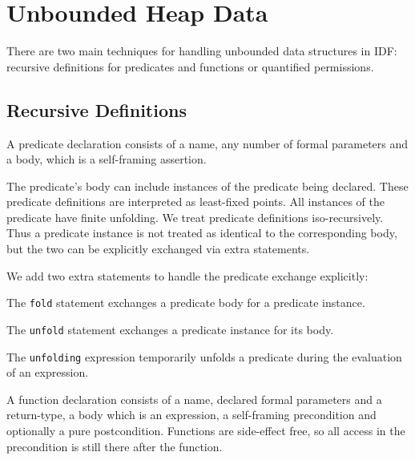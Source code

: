 \section{Unbounded Heap Data}
\begin{mytitle} There are two main techniques for handling unbounded data structures in IDF: recursive definitions for predicates and functions or quantified permissions.
\end{mytitle}

\subsection{Recursive Definitions}
\begin{mytitle}[Predicate] A predicate declaration consists of a name, any number of formal parameters and a body, which is a self-framing assertion. 
\end{mytitle}
\begin{mytitle} The predicate's body can include instances of the predicate being declared. These predicate definitions are interpreted as least-fixed points. All instances of the predicate have finite unfolding. We treat predicate definitions iso-recursively. Thus a predicate instance is not treated as identical to the corresponding body, but the two can be explicitly exchanged via extra statements.
\end{mytitle}
\begin{mytitle} We add two extra statements to handle the predicate exchange explicitly:
    \begin{mysubtitle} The \texttt{fold} statement exchanges a predicate body for a predicate instance.
    \end{mysubtitle}
    \begin{mysubtitle} The \texttt{unfold} statement exchanges a predicate instance for its body.
    \end{mysubtitle}
    \begin{mysubtitle} The \texttt{unfolding} expression temporarily unfolds a predicate during the evaluation of an expression.
    \end{mysubtitle}
\end{mytitle}
\begin{mytitle}[Function] A function declaration consists of a name, declared formal parameters and a return-type, a body which is an expression, a self-framing precondition and optionally a pure postcondition. Functions are side-effect free, so all access in the precondition is still there after the function.
\end{mytitle}
